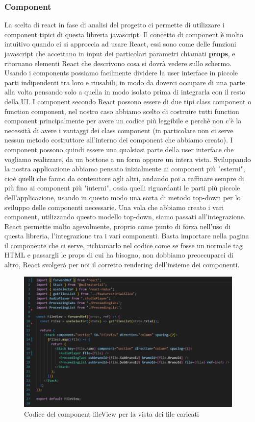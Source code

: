 \subsubsection{Component}
La scelta di react in fase di analisi del progetto ci permette di utilizzare i component tipici di questa libreria javascript. Il concetto di component è molto intuitivo quando ci si
approccia ad usare React, essi sono come delle funzioni javascript che accettano in input dei particolari parametri chiamati \textbf{props}, e ritornano elementi React che
descrivono cosa si dovrà vedere sullo schermo. Usando i components possiamo facilmente dividere la user interface in piccole parti indipendenti tra loro e riusabili, in modo da
doverci occupare di una parte alla volta pensando solo a quella in modo isolato prima di integrarla con il resto della UI.
I component secondo React possono essere di due tipi class component o function component, nel nostro caso abbiamo scelto di costruire tutti function component principalmente
per avere un codice più leggibile e perchè non c'è la necessità di avere i vantaggi dei class component (in particolare non ci serve nessun metodo costruttore all'interno dei component
che abbiamo creato). I component possono quindi essere una qualsiasi parte della user interface che vogliamo realizzare, da un bottone a un form oppure un intera vista. Sviluppando la
nostra applicazione abbiamo pensato inizialmente ai component più "esterni", cioè quelli che fanno da contenitore agli altri, andando poi a raffinare sempre di più fino ai component
più "interni", ossia quelli riguardanti le parti più piccole dell'applicazione, usando in questo modo una sorta di metodo top-down per lo sviluppo delle componenti necessarie.
Una vola che abbiamo creato i vari component, utilizzando questo modello top-down, siamo passati all'integrazione. React permette molto agevolmente, proprio come punto di forza
nell'uso di questa libreria, l'integrazione tra i vari componenti. Basta importare nella pagina il componente che ci serve, richiamarlo nel codice come se fosse un normale tag
HTML e passargli le props di cui ha bisogno, non dobbiamo preoccuparci di altro, React svolgerà per noi il corretto rendering dell'insieme dei componenti.

\begin{figure}[H]
  \centering
  \includegraphics[width=\textwidth]{immagini/fileView-component.png}
  \caption{Codice del component fileView per la vista dei file caricati}
\end{figure}

